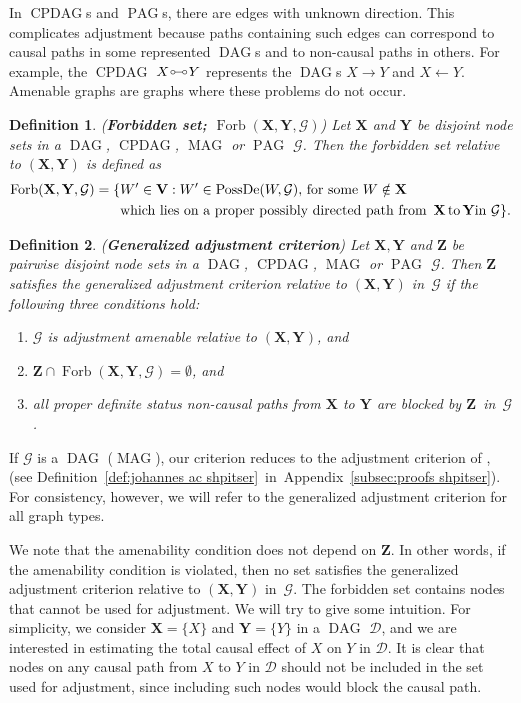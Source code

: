 \documentclass[11pt,a4paper]{article}
\makeatletter
\newtheorem{definition}{Definition}
\DeclareMathOperator{\CPDAG}{CPDAG}
\DeclareMathOperator{\DAG}{DAG}
\DeclareMathOperator{\MAG}{MAG}
\DeclareMathOperator{\PAG}{PAG}
\DeclareMathOperator{\PossDe}{PossDe}
\DeclareMathOperator{\Forbi}{Forb}
\newcommand{\amen}{the amenability condition\xspace}
\newcommand{\vars}[1][V]{\mathbf{#1}}
\newcommand{\g}[1][G]{\mathcal{#1}}
\newcommand{\fb}[2][X,Y]{\Forbi(\mathbf{#1},#2)}%
\newcommand{\circcirc}{
  \setlength{\unitlength}{1mm}
  \begin{picture}(5,1)(0,0)
    \put(1,1){\circle{1}}
    \put(1.5,1){\line(1,0){2}}
    \put(4,1){\circle{1}}
  \end{picture}
}
\def\cctext#1{\expandafter\@cctext\csname c@#1\endcsname}
\def\@cctext#1{\ifcase#1\or \textbf{Amenability}\or \textbf{Forbidden set}\or \textbf{Blocking}\fi}
\makeatother
\begin{document}
In $\CPDAG$s and $\PAG$s, there are edges with unknown direction. This complicates adjustment because paths containing such edges can correspond to causal paths in some represented $\DAG$s and to non-causal paths in others.
For example, the $\CPDAG$ $X \circcirc Y$ represents the $\DAG$s $X \rightarrow Y$ and $X \leftarrow Y$. Amenable graphs are graphs where these problems do not occur.
\begin{definition}(\textbf{Forbidden set; $\fb{\g}$})  Let $\mathbf{X}$ and $\mathbf{Y}$ be disjoint node sets in a $\DAG$, $\CPDAG$, $\MAG$ or $\PAG$ $\g$. Then the forbidden set relative to $(\mathbf{X,Y})$ is defined as
\begin{align}
   \fb{\g} = \{ & W' \in \vars: W' \in \PossDe(W,\g) \text{, for some } W \notin \mathbf{X} \, \notag \\
   & \text{which lies on a proper possibly} \text{ directed path from } \, \mathbf{X} \,\text{to}\, \mathbf{Y}\text{in } \g\}.\notag
\end{align} \label{def:forbidden nodes}
\end{definition}
\begin{definition}{(\textbf{Generalized adjustment criterion})}
   Let $\mathbf{X,Y}$ and $\mathbf{Z}$ be pairwise disjoint node sets in a $\DAG$, $\CPDAG$, $\MAG$ or $\PAG$ $\g$. Then $\mathbf{Z}$ satisfies the generalized adjustment criterion
      relative to $(\mathbf{X,Y})$ in~$\g$ if the following three conditions hold:
   \begin{enumerate}[label = (\cctext*), leftmargin=0.5cm,align=left]
   \item\label{cond0} $\g$ is adjustment amenable relative to $(\mathbf{X,Y})$, and
   \item\label{cond1} $\mathbf{Z} \cap \fb{\g} = \emptyset$, and
   \item\label{cond2} all proper definite status non-causal paths from $\mathbf{X}$ to $\mathbf{Y}$ are blocked by $\mathbf{Z}$~in~$\g$.
   \end{enumerate}  \label{def:gac}
\end{definition}

\noindent{}If $\g$ is a $\DAG$ ($\MAG$), our criterion reduces to the adjustment criterion of \cite{shpitser2012avalidity}, \citep{vanconstructing} (see Definition~\ref{def:johannes ac shpitser}~in~Appendix~\ref{subsec:proofs shpitser}). For consistency, however, we will refer to the generalized adjustment criterion for all graph types.

We note that \amen{} does not depend on $\mathbf{Z}$. In other words, if \amen{} is violated, then no set satisfies the generalized adjustment criterion relative to $(\mathbf{X,Y})$ in~$\g$. The forbidden set contains nodes that cannot be used for adjustment. We will try to give some intuition. For simplicity, we consider $\mathbf{X} = \{X\}$ and $\mathbf{Y} = \{Y\}$ in a $\DAG$ $\g[D]$, and we are interested in estimating the total causal effect of $X$ on $Y$ in $\g[D]$. It is clear that nodes on any causal path from $X$ to $Y$  in $\g[D]$ should not be included in the set used for adjustment, since including such nodes would block the causal path.
\end{document}
